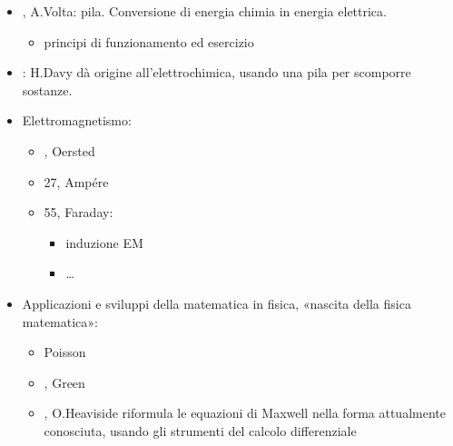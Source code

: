 \documentclass[letterpaper,10pt,italian]{jupyterBook}
\begin{document}
\begin{itemize}
\item {} 
, A.Volta: pila. Conversione di energia chimia in energia elettrica.
\begin{itemize}
\item {} 
\sphinxAtStartPar
{} principi di funzionamento ed esercizio

\end{itemize}

\item {} 
: H.Davy dà origine all’elettrochimica, usando una pila per scomporre sostanze.  

\item {} 
\sphinxAtStartPar
Elettromagnetismo:
\begin{itemize}
\item {} 
, Oersted

\item {} 
\sphinxhyphen{}27, Ampére

\item {} 
\sphinxhyphen{}55, Faraday:
\begin{itemize}
\item {} 
\sphinxAtStartPar
induzione EM

\item {} 
\sphinxAtStartPar
…

\end{itemize}

\end{itemize}

\item {} 
\sphinxAtStartPar
Applicazioni e sviluppi della matematica in fisica, «nascita della fisica matematica»:
\begin{itemize}
\item {} 
\sphinxAtStartPar
Poisson

\item {} 
, Green 

\item {} 
, O.Heaviside riformula le equazioni di Maxwell nella forma attualmente conosciuta, usando gli strumenti del calcolo differenziale


\end{itemize}
\end{itemize}
\end{document}
